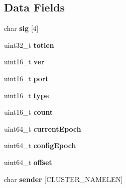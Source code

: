 \subsection*{Data Fields}
\begin{DoxyCompactItemize}
\item 
\mbox{\label{structclusterMsg_abb326313abd3ddb06eac6b9fd4273e96}} 
char {\bfseries sig} \mbox{[}4\mbox{]}
\item 
\mbox{\label{structclusterMsg_a5ef56726841594a3d31e8d1f9db9cdc8}} 
uint32\+\_\+t {\bfseries totlen}
\item 
\mbox{\label{structclusterMsg_a27c8382011859c9773f0303f59bac116}} 
uint16\+\_\+t {\bfseries ver}
\item 
\mbox{\label{structclusterMsg_a610f1d78c588de5b3c3414f892e72974}} 
uint16\+\_\+t {\bfseries port}
\item 
\mbox{\label{structclusterMsg_a06118df79b802adc033967b7d42ddd8c}} 
uint16\+\_\+t {\bfseries type}
\item 
\mbox{\label{structclusterMsg_aba0776aac818854ae51ee0ed428d766b}} 
uint16\+\_\+t {\bfseries count}
\item 
\mbox{\label{structclusterMsg_af587c060955ca4028c33087afaaceca4}} 
uint64\+\_\+t {\bfseries current\+Epoch}
\item 
\mbox{\label{structclusterMsg_a45369d8251925dbda938652bf1f4438c}} 
uint64\+\_\+t {\bfseries config\+Epoch}
\item 
\mbox{\label{structclusterMsg_aa79837822db47e45154fc4ee08e3f246}} 
uint64\+\_\+t {\bfseries offset}
\item 
\mbox{\label{structclusterMsg_acbf8f00d4c949073cb849d4f32ae6f53}} 
char {\bfseries sender} \mbox{[}C\+L\+U\+S\+T\+E\+R\+\_\+\+N\+A\+M\+E\+L\+EN\mbox{]}
\item 
\mbox{\label{structclusterMsg_a399581369cf6bda15a4ff0d06d72a119}} 

\end{DoxyCompactItemize}
